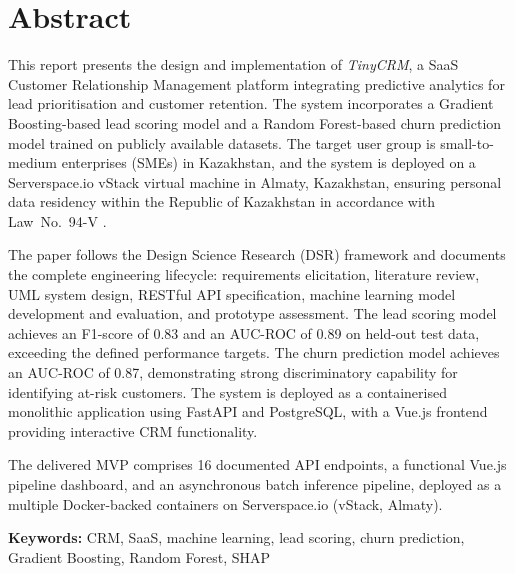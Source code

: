 \chapter{Abstract}
\begin{SingleSpace}

This report presents the design and implementation of \textit{TinyCRM}, a 
SaaS Customer Relationship Management platform integrating predictive analytics 
for lead prioritisation and customer retention. The system incorporates a 
Gradient Boosting-based lead scoring model and a Random Forest-based churn 
prediction model trained on publicly available datasets. The target user group
is small-to-medium enterprises (SMEs) in Kazakhstan, and the system is
deployed on a Serverspace.io vStack virtual machine in Almaty, Kazakhstan, ensuring
personal data residency within the Republic of Kazakhstan in accordance with
Law~No.~94-V \citep{serverspacedocs2025,kazakhstanlaw94v}.

The paper follows the Design Science Research (DSR) framework
\citep{hevner2004} and documents the complete engineering lifecycle:
requirements elicitation, literature review, UML system design,
RESTful API specification, machine learning model development and
evaluation, and prototype assessment. The lead scoring model achieves an 
F1-score of 0.83 and an AUC-ROC of 0.89 on held-out test data, exceeding the 
defined performance targets. The churn prediction model achieves an AUC-ROC of 0.87, 
demonstrating strong discriminatory capability for identifying at-risk customers. 
The system is deployed as a containerised monolithic application using FastAPI and 
PostgreSQL, with a Vue.js frontend providing interactive CRM functionality.


The delivered MVP comprises 16 documented API endpoints, a functional Vue.js pipeline
dashboard, and an asynchronous batch inference pipeline, deployed as a
multiple Docker-backed containers on Serverspace.io (vStack, Almaty).

\bigskip
\noindent\textbf{Keywords:} CRM, SaaS, machine learning, lead scoring,
churn prediction, Gradient Boosting, Random Forest, SHAP

\end{SingleSpace}
